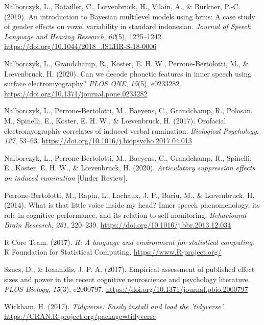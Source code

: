 \documentclass[
  english,
  man,floatsintext]{apa6}
\newlength{\cslhangindent}
\newenvironment{cslreferences}%
  {\setlength{\parindent}{0pt}%
  \everypar{\setlength{\hangindent}{\cslhangindent}}\ignorespaces}%
  {\par}
\begin{document}
\begin{cslreferences}
\leavevmode\hypertarget{ref-nalborczyk_introduction_2019}{}%
Nalborczyk, L., Batailler, C., Lœvenbruck, H., Vilain, A., \& Bürkner, P.-C. (2019). An introduction to Bayesian multilevel models using brms: A case study of gender effects on vowel variability in standard indonesian. \emph{Journal of Speech Language and Hearing Research}, \emph{62}(5), 1225--1242. \url{https://doi.org/10.1044/2018_JSLHR-S-18-0006}

\leavevmode\hypertarget{ref-nalborczyk_can_2020}{}%
Nalborczyk, L., Grandchamp, R., Koster, E. H. W., Perrone-Bertolotti, M., \& Lœvenbruck, H. (2020). Can we decode phonetic features in inner speech using surface electromyography? \emph{PLOS ONE}, \emph{15}(5), e0233282. \url{https://doi.org/10.1371/journal.pone.0233282}

\leavevmode\hypertarget{ref-nalborczyk_orofacial_2017}{}%
Nalborczyk, L., Perrone-Bertolotti, M., Baeyens, C., Grandchamp, R., Polosan, M., Spinelli, E., Koster, E. H. W., \& Lœvenbruck, H. (2017). Orofacial electromyographic correlates of induced verbal rumination. \emph{Biological Psychology}, \emph{127}, 53--63. \url{https://doi.org/10.1016/j.biopsycho.2017.04.013}

\leavevmode\hypertarget{ref-nalborczyk_articulatory_2020}{}%
Nalborczyk, L., Perrone-Bertolotti, M., Baeyens, C., Grandchamp, R., Spinelli, E., Koster, E. H. W., \& Lœvenbruck, H. (2020). \emph{Articulatory suppression effects on induced rumination} {[}Under Review{]}.

\leavevmode\hypertarget{ref-perrone-bertolotti_what_2014}{}%
Perrone-Bertolotti, M., Rapin, L., Lachaux, J. P., Baciu, M., \& Lœvenbruck, H. (2014). What is that little voice inside my head? Inner speech phenomenology, its role in cognitive performance, and its relation to self-monitoring. \emph{Behavioural Brain Research}, \emph{261}, 220--239. \url{https://doi.org/10.1016/j.bbr.2013.12.034}

\leavevmode\hypertarget{ref-R-base}{}%
R Core Team. (2017). \emph{R: A language and environment for statistical computing}. R Foundation for Statistical Computing. \url{https://www.R-project.org/}

\leavevmode\hypertarget{ref-szucs_empirical_2017}{}%
Szucs, D., \& Ioannidis, J. P. A. (2017). Empirical assessment of published effect sizes and power in the recent cognitive neuroscience and psychology literature. \emph{PLOS Biology}, \emph{15}(3), e2000797. \url{https://doi.org/10.1371/journal.pbio.2000797}

\leavevmode\hypertarget{ref-R-tidyverse}{}%
Wickham, H. (2017). \emph{Tidyverse: Easily install and load the 'tidyverse'}. \url{https://CRAN.R-project.org/package=tidyverse}


\end{cslreferences}
\end{document}
